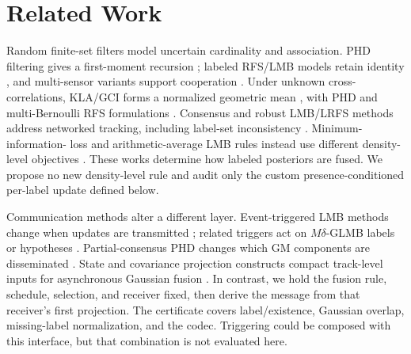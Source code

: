 \section{Related Work}
\label{sec:related-work}

Random finite-set filters model uncertain cardinality and association. PHD
filtering gives a first-moment recursion \cite{Mahler2003PHD}; labeled RFS/LMB
models retain identity \cite{Vo2014LRFS,Reuter2014LMB}, and multi-sensor variants
support cooperation \cite{Vo2019MSGLMB}. Under unknown cross-correlations,
KLA/GCI forms a normalized geometric mean \cite{Battistelli2014KLA}, with PHD
and multi-Bernoulli RFS formulations \cite{Uney2013EMDPHD,Wang2017MBGCI}.
Consensus and robust LMB/LRFS methods address networked tracking, including
label-set inconsistency
\cite{Fantacci2015ConsensusLRFS,Shen2022ConsensusLMB,
Li2018RobustDistributedLRFS,Li2019EfficientMultiAgentLRFS}. Minimum-information-
loss and arithmetic-average LMB rules instead use different density-level
objectives \cite{Gao2020MIL,Wei2024AALMB}. These works determine how labeled
posteriors are fused. We propose no new density-level rule and audit only the
custom presence-conditioned per-label update defined below.

\newpage

Communication methods alter a different layer. Event-triggered LMB methods
change when updates are transmitted
\cite{Shen2022EventTriggeredLMB,Li2023EventTriggeredConsensusLMB}; related
triggers act on $M\delta$-GLMB labels or hypotheses
\cite{Li2026EventTriggeredMdeltaGLMB}. Partial-consensus PHD changes which GM
components are disseminated \cite{Li2019PartialConsensusGMPHD}. State and
covariance projection constructs compact track-level inputs for asynchronous
Gaussian fusion \cite{Xue2026StateCovProjection}. In contrast, we hold the
fusion rule, schedule, selection, and receiver fixed, then derive the message
from that receiver's first projection. The certificate covers label/existence,
Gaussian overlap, missing-label normalization, and the codec. Triggering could
be composed with this interface, but that combination is not evaluated here.
